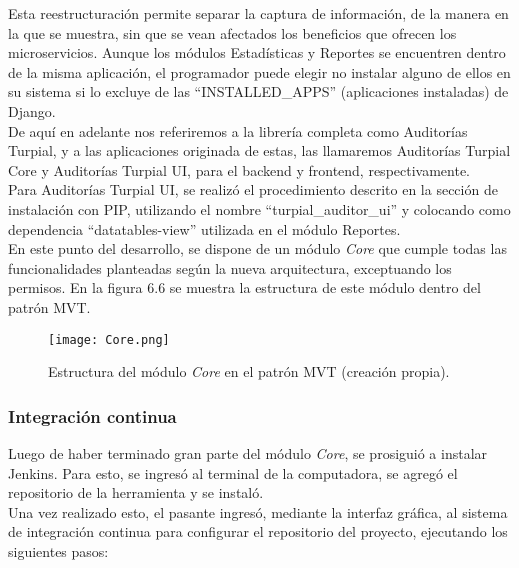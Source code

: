 Esta reestructuración permite separar la captura de información, de la manera en la que se muestra, sin que se vean afectados los beneficios que ofrecen los microservicios. Aunque los módulos Estadísticas y Reportes se encuentren dentro de la misma aplicación, el programador puede elegir no instalar alguno de ellos en su sistema si lo excluye de las “INSTALLED\_APPS” (aplicaciones instaladas) de Django.\\

De aquí en adelante nos referiremos a la librería completa como Auditorías Turpial, y a las aplicaciones originada de estas, las llamaremos Auditorías Turpial Core y Auditorías Turpial UI, para el backend y frontend, respectivamente.\\

Para Auditorías Turpial UI, se realizó el procedimiento descrito en la sección de instalación con PIP, utilizando el nombre “turpial\_auditor\_ui” y colocando como dependencia “datatables-view” utilizada en el módulo Reportes.\\

En este punto del desarrollo, se dispone de un módulo \textit{Core} que cumple todas las funcionalidades planteadas según la nueva arquitectura, exceptuando los permisos. En la figura 6.6 se muestra la estructura de este módulo dentro del patrón MVT.

\begin{figure}[h]
\centering
\texttt{[image: Core.png]}
\caption{Estructura del módulo \textit{Core} en el patrón MVT (creación propia).}
\label{fig:figura6.6}
\end{figure}

\subsubsection{Integración continua}

Luego de haber terminado gran parte del módulo \textit{Core}, se prosiguió a instalar Jenkins. Para esto, se ingresó al terminal de la computadora, se agregó el repositorio de la herramienta y se instaló.\\

Una vez realizado esto, el pasante ingresó, mediante la interfaz gráfica, al sistema de integración continua para configurar el repositorio del proyecto, ejecutando los siguientes pasos:

